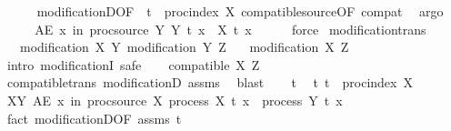 \begin{isabellebody}
\ \ \ \ \isamarkupfalse%
\ modificationD{\isacharparenleft}{\kern0pt}{}{\isacharparenright}{\kern0pt}{\isacharbrackleft}{\kern0pt}OF\ {\isacharasterisk}{\kern0pt}\ {\isacartoucheopen}t\ {\isasymin}\ proc{\isacharunderscore}{\kern0pt}index\ X{\isacartoucheclose}{\isacharbrackright}{\kern0pt}\ compatible{\isacharunderscore}{\kern0pt}source{\isacharbrackleft}{\kern0pt}OF\ compat{\isacharbrackright}{\kern0pt}\ \isamarkupfalse%
\ argo\isanewline
\ \ \isamarkupfalse%
\ \isamarkupfalse%
\ {\isachardoublequoteopen}AE\ x\ in\ proc{\isacharunderscore}{\kern0pt}source\ Y{\isachardot}{\kern0pt}\ Y\ t\ x\ {\isacharequal}{\kern0pt}\ X\ t\ x{\isachardoublequoteclose}\isanewline
\ \ \ \ \isamarkupfalse%
\ force\isanewline
{}\isamarkupfalse%
%
\endisatagproof
{\isafoldproof}%
%
\isadelimproof
\isanewline
%
\endisadelimproof
\isanewline
{}\isamarkupfalse%
\ modification{\isacharunderscore}{\kern0pt}trans{\isacharcolon}{\kern0pt}\isanewline
\ \ \ {\isachardoublequoteopen}modification\ X\ Y{\isachardoublequoteclose}\ {\isachardoublequoteopen}modification\ Y\ Z{\isachardoublequoteclose}\isanewline
\ \ \ {\isachardoublequoteopen}modification\ X\ Z{\isachardoublequoteclose}\isanewline
%
\isadelimproof
%
\endisadelimproof
%
\isatagproof
{}\isamarkupfalse%
\ {\isacharparenleft}{\kern0pt}intro\ modificationI{\isacharcomma}{\kern0pt}\ safe{\isacharparenright}{\kern0pt}\isanewline
\ \ \isamarkupfalse%
\ {\isachardoublequoteopen}compatible\ X\ Z{\isachardoublequoteclose}\isanewline
\ \ \ \ \isamarkupfalse%
\ compatible{\isacharunderscore}{\kern0pt}trans\ modificationD{\isacharparenleft}{\kern0pt}{}{\isacharparenright}{\kern0pt}\ assms\ \isamarkupfalse%
\ blast\isanewline
\ \ \isamarkupfalse%
\ t\ \isamarkupfalse%
\ t{\isacharcolon}{\kern0pt}\ {\isachardoublequoteopen}t\ {\isasymin}\ proc{\isacharunderscore}{\kern0pt}index\ X{\isachardoublequoteclose}\isanewline
\ \ \isamarkupfalse%
\ XY{\isacharcolon}{\kern0pt}\ {\isachardoublequoteopen}AE\ x\ in\ proc{\isacharunderscore}{\kern0pt}source\ X{\isachardot}{\kern0pt}\ process\ X\ t\ x\ {\isacharequal}{\kern0pt}\ process\ Y\ t\ x{\isachardoublequoteclose}\isanewline
\ \ \ \ \isamarkupfalse%
\ {\isacharparenleft}{\kern0pt}fact\ modificationD{\isacharparenleft}{\kern0pt}{}{\isacharparenright}{\kern0pt}{\isacharbrackleft}{\kern0pt}OF\ assms{\isacharparenleft}{\kern0pt}{}{\isacharparenright}{\kern0pt}\ t{\isacharbrackright}{\kern0pt}{\isacharparenright}{\kern0pt}\isanewline

\end{isabellebody}
